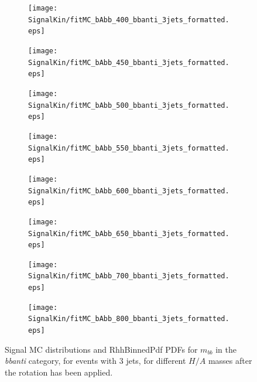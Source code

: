 \begin{figure}[phtb!]
  \begin{center}
  \begin{subfigure}[$m_{A}=400$ GeV]{0.4\textwidth}\texttt{[image: SignalKin/fitMC\_bAbb\_400\_bbanti\_3jets\_formatted.eps]}\end{subfigure}
  \begin{subfigure}[$m_{A}=450$ GeV]{0.4\textwidth}\texttt{[image: SignalKin/fitMC\_bAbb\_450\_bbanti\_3jets\_formatted.eps]}\end{subfigure}
  \begin{subfigure}[$m_{A}=500$ GeV]{0.4\textwidth}\texttt{[image: SignalKin/fitMC\_bAbb\_500\_bbanti\_3jets\_formatted.eps]}\end{subfigure}
  \begin{subfigure}[$m_{A}=550$ GeV]{0.4\textwidth}\texttt{[image: SignalKin/fitMC\_bAbb\_550\_bbanti\_3jets\_formatted.eps]}\end{subfigure}
  \begin{subfigure}[$m_{A}=600$ GeV]{0.4\textwidth}\texttt{[image: SignalKin/fitMC\_bAbb\_600\_bbanti\_3jets\_formatted.eps]}\end{subfigure}
  \begin{subfigure}[$m_{A}=650$ GeV]{0.4\textwidth}\texttt{[image: SignalKin/fitMC\_bAbb\_650\_bbanti\_3jets\_formatted.eps]}\end{subfigure}
  \begin{subfigure}[$m_{A}=700$ GeV]{0.4\textwidth}\texttt{[image: SignalKin/fitMC\_bAbb\_700\_bbanti\_3jets\_formatted.eps]}\end{subfigure}
  \begin{subfigure}[$m_{A}=800$ GeV]{0.4\textwidth}\texttt{[image: SignalKin/fitMC\_bAbb\_800\_bbanti\_3jets\_formatted.eps]}\end{subfigure}
  \caption{Signal MC distributions and RhhBinnedPdf PDFs for $m_{bb}$ in the {\it bbanti} category, for events with 3 jets, for different $H/A$ masses after the rotation has been applied.\label{fig:signalPDFs_3j_bbanti}} 
    \end{center}
\end{figure}


